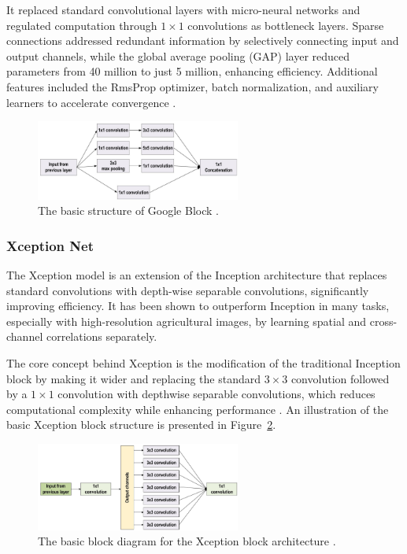 It replaced standard convolutional layers with micro-neural networks and regulated computation through $1 \times 1$ convolutions as bottleneck layers. Sparse connections addressed redundant information by selectively connecting input and output channels, while the global average pooling (GAP) layer reduced parameters from 40 million to just 5 million, enhancing efficiency. Additional features included the RmsProp optimizer, batch normalization, and auxiliary learners to accelerate convergence \parencite{alzubaidi2021review}.



\begin{figure}[H] %
    \centering
    \includegraphics[width=0.6\textwidth]{chapters/chapter1/images/Figure09.png}
    \caption{The basic structure of Google Block \parencite{alzubaidi2021review}.}
    \label{fig:figure09}
\end{figure}

\subsubsection{Xception Net}

The Xception model is an extension of the Inception architecture that replaces standard convolutions with depth-wise separable convolutions, significantly improving efficiency. It has been shown to outperform Inception in many tasks, especially with high-resolution agricultural images, by learning spatial and cross-channel correlations separately.

The core concept behind Xception is the modification of the traditional Inception block by making it wider and replacing the standard $3 \times 3$ convolution followed by a $1 \times 1$ convolution with depthwise separable convolutions, which reduces computational complexity while enhancing performance \parencite{alzubaidi2021review}. An illustration of the basic Xception block structure is presented in Figure~\ref{fig:figure10}.


\begin{figure}[H] %
    \centering
    \includegraphics[width=0.6\textwidth]{chapters/chapter1/images/Figure10.png}
    \caption{The basic block diagram for the Xception block architecture \parencite{alzubaidi2021review}.}
    \label{fig:figure10}
\end{figure}

